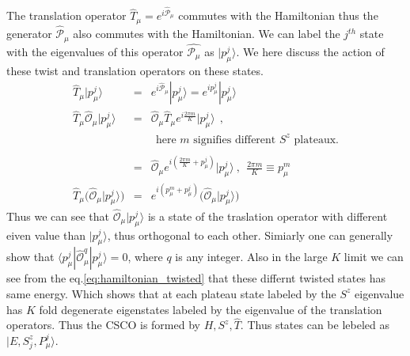 \documentclass[reprint,prb,superscriptaddress]{revtex4-1}
\begin{document}
\noindent The translation operator $\hat{T}_{\mu}=e^{i\hat{\mathcal{P}}_{\mu}}$ commutes with the Hamiltonian thus the generator $\hat{\mathcal{P}}_{\mu}$ also commutes with the Hamiltonian. We can label the $j^{th}$ state with the eigenvalues of this operator $\hat{\mathcal{P}_{\mu}}$ as $|p^{j}_{\mu}\rangle$. We here discuss the action of these twist and translation operators on these states.
\begin{eqnarray}
\hat{T}_{\mu} |p^j_{\mu} \rangle &=& e^{i\hat{\mathcal{P}}_{\mu}} |p^j_{\mu} \rangle = e^{ip^j_{\mu}} |p^j_{\mu}\rangle \nonumber\\
\hat{T}_{\mu} \hat{\mathcal{O}}_{\mu} |p^j_{\mu} \rangle &=&  \hat{\mathcal{O}}_{\mu} \hat{T}_{\mu} e^{i\frac{2\pi m}{K}} |p^j_{\mu}\rangle~~, \nonumber\\
&&~~\textrm{here $m$ signifies different $S^z$ plateaux.} \nonumber\\ \nonumber\\
&=& \hat{\mathcal{O}}_{\mu}   e^{i(\frac{2\pi m}{K}+p_{\mu}^j)} |p^j_{\mu}\rangle~,~~ \frac{2\pi m}{K} \equiv p_{\mu}^{m} \nonumber\\
\hat{T}_{\mu} \bigg( \hat{\mathcal{O}}_{\mu} |p^j_{\mu} \rangle  \bigg) &=& e^{i(p_{\mu}^{m}+p_{\mu}^j)} \bigg( \hat{\mathcal{O}}_{\mu}    |p^j_{\mu}\rangle \bigg)    
\end{eqnarray}
Thus we can see that  $\hat{\mathcal{O}}_{\mu} |p^j_{\mu} \rangle $ is a state of the traslation operator with different eiven value than $|p^j_{\mu} \rangle $, thus orthogonal to each other. Simiarly one can generally show that $\langle p^j_{\mu} | \hat{\mathcal{O}}^{q}_{\mu} |p^j_{\mu} \rangle=0$, where $q$ is any integer. Also in the large $K$ limit we can see from the eq.\eqref{eq:hamiltonian_twisted} that these differnt twisted states has same energy. Which shows that at each plateau state labeled by the $S^z$ eigenvalue has $K$ fold degenerate eigenstates labeled by the eigenvalue of the translation operators. Thus the CSCO is formed by $H,S^z,\hat{T}$. Thus states can be lebeled as  $|E,S^z_j,P^j_{\mu}\rangle$. 


\appendix
\end{document}
